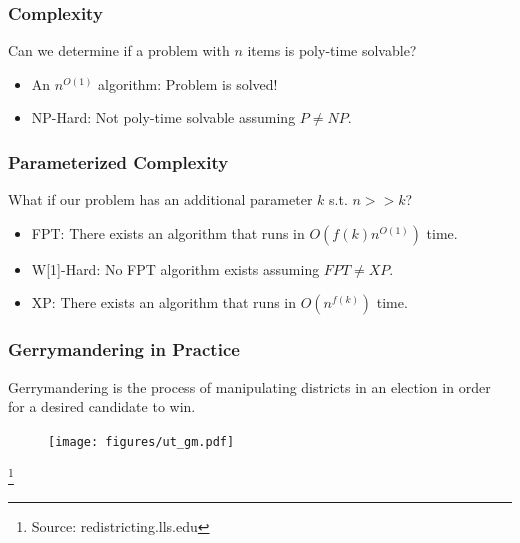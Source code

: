 \begin{frame}[t]
	\frametitle{Complexity}
		Can we determine if a problem with $n$ items is poly-time solvable?
		\vspace{1.0cm}
		\begin{itemize}
			\item An $n^{O(1)}$ algorithm: Problem is solved!
			\vspace{1.0cm}
			\item NP-Hard: Not poly-time solvable assuming $P \neq NP$.
		\end{itemize}
\end{frame}

\begin{frame}[t]
	\frametitle{Parameterized Complexity}
	What if our problem has an additional parameter $k$ s.t. $n >> k$?
	\vspace{1.0cm}
	\begin{itemize}
		\item FPT: There exists an algorithm that runs in $O(f(k)n^{O(1)})$ time.
		\vspace{1.0cm}
		\item W[1]-Hard: No FPT algorithm exists assuming $FPT \neq XP$.
		\vspace{1.0cm}
		\item XP: There exists an algorithm that runs in $O(n^{f(k)})$ time.
	\end{itemize}
\end{frame}

\begin{frame}[t]
	\frametitle{Gerrymandering in Practice}
	Gerrymandering is the process of manipulating districts in an election in order for a desired candidate to win.
	\vspace{0.5em}

			\begin{figure}
				\begin{center}
					\texttt{[image: figures/ut\_gm.pdf]}
				\end{center}
			\end{figure}
			{\let\thefootnote\relax\footnote{{Source: redistricting.lls.edu}}}
\end{frame}

